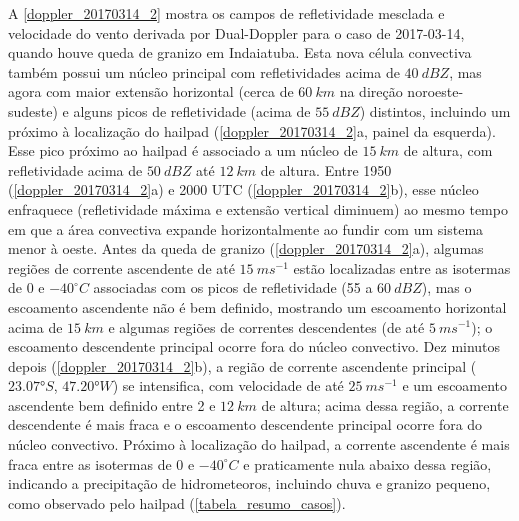 A \autoref{doppler_20170314_2} mostra os campos de refletividade mesclada e velocidade do vento derivada por Dual-Doppler para o caso de 2017-03-14, quando houve queda de granizo em Indaiatuba. Esta nova célula convectiva também possui um núcleo principal com refletividades acima de $40\:dBZ$, mas agora com maior extensão horizontal (cerca de $60\:km$ na direção noroeste-sudeste) e alguns picos de refletividade (acima de $55\:dBZ$) distintos, incluindo um próximo à localização do hailpad (\autoref{doppler_20170314_2}a, painel da esquerda). Esse pico próximo ao hailpad é associado a um núcleo de $15\:km$ de altura, com refletividade acima de $50\:dBZ$ até $12\:km$ de altura. Entre 1950 (\autoref{doppler_20170314_2}a) e 2000 UTC (\autoref{doppler_20170314_2}b), esse núcleo enfraquece (refletividade máxima e extensão vertical diminuem) ao mesmo tempo em que a área convectiva expande horizontalmente ao fundir com um sistema menor à oeste. Antes da queda de granizo (\autoref{doppler_20170314_2}a), algumas regiões de corrente ascendente de até $15\:ms^{-1}$ estão localizadas entre as isotermas de 0 e $-40^{\circ}C$ associadas com os picos de refletividade (55 a $60\:dBZ$), mas o escoamento ascendente não é bem definido, mostrando um escoamento horizontal acima de $15\:km$ e algumas regiões de correntes descendentes (de até $5\:ms^{-1}$); o escoamento descendente principal ocorre fora do núcleo convectivo. Dez minutos depois (\autoref{doppler_20170314_2}b), a região de corrente ascendente principal ($\ang{23.07}S$, $\ang{47.20}W$) se intensifica, com velocidade de até $25\:ms^{-1}$ e um escoamento ascendente bem definido entre 2 e $12\:km$ de altura; acima dessa região, a corrente descendente é mais fraca e o escoamento descendente principal ocorre fora do núcleo convectivo. Próximo à localização do hailpad, a corrente ascendente é mais fraca entre as isotermas de 0 e $-40^{\circ}C$ e praticamente nula abaixo dessa região, indicando a precipitação de hidrometeoros, incluindo chuva e granizo pequeno, como observado pelo hailpad (\autoref{tabela_resumo_casos}).

